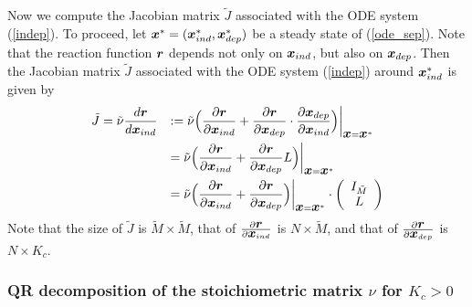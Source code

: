 \documentclass[ amsmath,amssymb,nofootinbib
]{revtex4-1}
\def\mbf#1{\mbox{\boldmath $#1$}}
\newcommand{\be}{\begin{equation}}
\newcommand{\ee}{\end{equation}}
\newcommand{\bx}{{\mbf x}}
\newcommand{\br}{{\mbf r}}
\newcommand{\tM}{{\tilde M}}
\newcommand{\tnu}{{\tilde \nu}}
\newcommand{\tJ}{{\tilde J}}
\newcommand{\p}{\partial}
\begin{document}
Now we compute the Jacobian matrix $\tJ$ associated with the ODE system (\ref{indep}).
To proceed, let $\bx^* = (\bx^*_{ind}, \bx^*_{dep})$ be a steady state of (\ref{ode_sep}).
Note that the reaction function $\br$ depends not only on ${\mbf x}_{ind}$, but also on ${\mbf x}_{dep}$.
Then the Jacobian matrix $\tJ$ associated with the ODE system (\ref{indep}) around $\bx^*_{ind}$ is given by
\be \label{J'0}
\begin{array}{ll}
\tJ    = \tnu  \dfrac{d \br  }{d {\mbf x_{ind}}}
        & := \tnu  \Big(\dfrac{\p \br }{\p {\mbf x}_{ind}}
                        +\dfrac{\p \br }{\p {\mbf x}_{dep}} \cdot \dfrac{\p \bx_{dep} }{\p {\mbf x}_{ind}} \Big)\biggr|_{\bx = \bx^*}   \\[2.5ex]
     & = \tnu  \Big(\dfrac{\p \br }{\p {\mbf x}_{ind}}+\dfrac{\p \br }{\p {\mbf x}_{dep}}L \Big)\biggr|_{\bx = \bx^*}  \\[2.5ex]
     & = \tnu  \Big(\dfrac{\p \br }{\p {\mbf x}_{ind}}+\dfrac{\p \br }{\p {\mbf x}_{dep}} \Big)\biggr|_{\bx = \bx^*}
            \cdot \left(
            \begin{array}{c}
              I_{\tM}\\
               L
             \end{array}
             \right)
             \end{array}
             \ee
Note that the size of $\tJ$ is $\tM \times \tM$, that of $\frac{\p \br }{\p {\mbf x}_{ind}}$ is $N\times \tM$,
and that of $\frac{\p \br }{\p {\mbf x}_{dep}}$ is $N \times K_c$.




\subsubsection{QR decomposition of the stoichiometric matrix $\nu$ for $K_c >0$}
\end{document}
